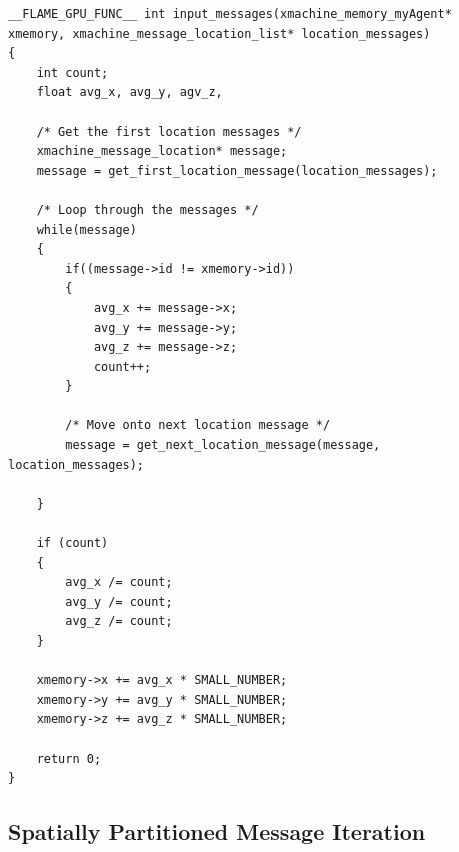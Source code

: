 \documentclass[11pt, a4paper, onecolumn, oneside]{report}
\begin{document}
\begin{verbatim}
__FLAME_GPU_FUNC__ int input_messages(xmachine_memory_myAgent* xmemory, xmachine_message_location_list* location_messages)
{
    int count;
    float avg_x, avg_y, agv_z,

    /* Get the first location messages */
    xmachine_message_location* message;
    message = get_first_location_message(location_messages);

    /* Loop through the messages */
    while(message)
    {
        if((message->id != xmemory->id))
        {
            avg_x += message->x;
            avg_y += message->y;
            avg_z += message->z;
            count++;
        }

        /* Move onto next location message */
        message = get_next_location_message(message, location_messages);

    }

    if (count)
    {
        avg_x /= count;
        avg_y /= count;
        avg_z /= count;
    }

    xmemory->x += avg_x * SMALL_NUMBER;
    xmemory->y += avg_y * SMALL_NUMBER;
    xmemory->z += avg_z * SMALL_NUMBER;

    return 0;
}
\end{verbatim}

\subsection{Spatially Partitioned Message Iteration}
\label{sec:352}
\end{document}
